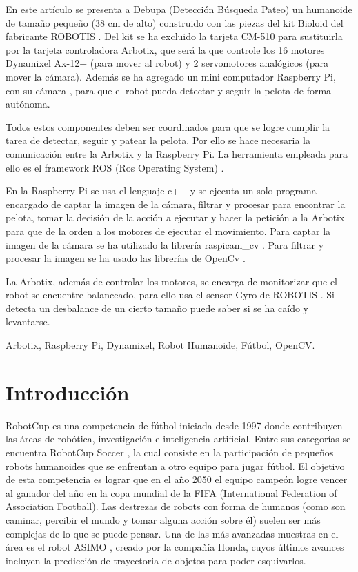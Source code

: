 \documentclass[conference, letterpaper]{IEEEtranMC1}
\begin{document}
\begin{abstractSP}
En este artículo se presenta a Debupa (Detección Búsqueda Pateo) un humanoide de tamaño pequeño (38 cm de alto) construido con las piezas del kit Bioloid \cite{robotics} del fabricante ROBOTIS \cite{robotics1}. Del kit se ha excluido la tarjeta CM-510 para sustituirla por la tarjeta controladora Arbotix, que será la que controle los 16 motores Dynamixel Ax-12+ (para mover al robot) y 2 servomotores analógicos (para mover la cámara). Además se ha agregado un mini computador Raspberry Pi, con su cámara \cite{raspberrycam}, para que el robot pueda detectar y seguir la pelota de forma autónoma. 

Todos estos componentes deben ser coordinados para que se logre cumplir la tarea de detectar, seguir y patear la pelota. Por ello se hace necesaria la comunicación entre la Arbotix y la Raspberry Pi. La herramienta empleada para ello es el framework ROS (Ros Operating System) \cite{ros}.

En la Raspberry Pi se usa el lenguaje c++ y se ejecuta un solo programa encargado de captar la imagen de la cámara, filtrar y procesar para encontrar la pelota, tomar la decisión de la acción a ejecutar y hacer la petición a la Arbotix para que de la orden a los motores de ejecutar el movimiento. Para captar la imagen de la cámara se ha utilizado la librería raspicam\_cv \cite{camara}. Para filtrar y procesar la imagen se ha usado las librerías de OpenCv \cite{opencv}. 

La Arbotix, además de controlar los motores, se encarga de monitorizar que el robot se encuentre balanceado, para ello usa el sensor Gyro de ROBOTIS \cite{gyro}. Si detecta un desbalance de un cierto tamaño puede saber si se ha caído y levantarse. 

\end{abstractSP}

\begin{IEEEkeywordsSP}
Arbotix, Raspberry Pi, Dynamixel, Robot Humanoide, Fútbol, OpenCV.
\end{IEEEkeywordsSP}


\IEEEpeerreviewmaketitle

\section{Introducci\'on}
RobotCup \cite{robotcup} es una competencia de fútbol iniciada desde 1997 donde contribuyen las áreas de robótica, investigación e inteligencia artificial. Entre sus categorías se encuentra RobotCup Soccer \cite{robotcupsoccer}, la cual consiste en la participación de pequeños robots humanoides que se enfrentan a otro equipo para jugar fútbol. El objetivo de esta competencia es lograr que en el año 2050 el equipo campeón logre vencer al ganador del año en la copa mundial de la FIFA (International Federation of Association Football). Las destrezas de robots con forma de humanos (como son caminar, percibir el mundo y tomar alguna acción sobre él) suelen ser más complejas de lo que se puede pensar. Una de las más avanzadas muestras en el área es el robot ASIMO \cite{asimo}, creado por la compañía Honda, cuyos últimos avances incluyen la predicción de trayectoria de objetos para poder esquivarlos.
\end{document}
